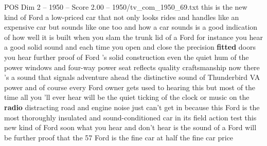 \begin{textsample}{POS Dim 2 – 1950 – Score 2.00 – 1950/tv\_com\_1950\_69.txt}  \label{ex:f2_pos_013}
this is the new kind of Ford a low-priced car that not only looks rides and handles like an expensive car but sounds like one too and how a car sounds is a good indication of how well it is built when you slam the trunk lid of a Ford for instance you hear a good solid sound and each time you open and close the precision \textbf{fitted} doors you hear further proof of Ford 's solid construction even the quiet hum of the power windows and four-way power seat reflects quality craftsmanship now there 's a sound that signals adventure ahead the distinctive sound of Thunderbird VA power and of course every Ford owner gets used to hearing this but most of the time all you 'll ever hear will be the quiet ticking of the clock or music on the \textbf{radio} distracting road and engine noise just can't get in because this Ford is the most thoroughly insulated and sound-conditioned car in its field action test this new kind of Ford soon what you hear and don't hear is the sound of a Ford will be further proof that the 57 Ford is the fine car at half the fine car price

\end{textsample}
